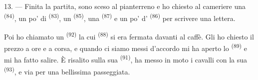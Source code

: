 13. --- Finita la partita, sono sceso al pianterreno e ho chiesto al cameriere una
 \textsuperscript{(84)}, un po' di 
\textsuperscript{(83)}, un  \textsuperscript{(85)}, una
 \textsuperscript{(87)} e un po' d'
\textsuperscript{(86)} per scrivere una lettera.

Poi ho chiamato un  \textsuperscript{(92)} la cui 
\textsuperscript{(88)} si era fermata davanti al caffè. Gli ho chiesto il prezzo a ore
e a corsa, e quando ci siamo messi d'accordo mi ha aperto lo 
\textsuperscript{(89)} e mi ha fatto salire. È risalito sulla sua 
\textsuperscript{(91)}, ha messo in moto i cavalli con la sua 
\textsuperscript{(93)}, e via per una bellissima passeggiata.
\VUsaut{6.0mm}
\VUfilet{22mm}
